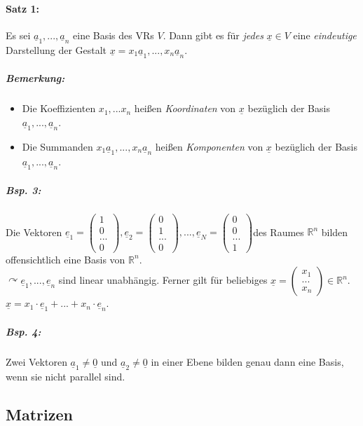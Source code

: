 \paragraph{Satz 1:}\parskp
Es sei $\underline{a}_1, ..., \underline{a}_n$ eine Basis des VRs $V$. Dann gibt es für \emph{jedes} $\underline{x}\in V$ eine \emph{eindeutige} Darstellung der Gestalt $\underline{x}=x_1\underline{a}_1, ..., x_n\underline{a}_n$.
\subparagraph{Bemerkung:}
\begin{itemize}
\item Die Koeffizienten $x_1,...x_n$ heißen \emph{Koordinaten} von $\underline{x}$ bezüglich der Basis $\underline{a}_1, ..., \underline{a}_n$.
\item Die Summanden $x_1\underline{a}_1, ..., x_n\underline{a}_n$ heißen \emph{Komponenten} von $\underline{x}$ bezüglich der Basis $\underline{a}_1, ..., \underline{a}_n$.
\end{itemize}
\subparagraph{Bsp. 3:} \parskp
Die Vektoren $\underline{e}_1=\begin{pmatrix}
1\\0\\...\\0
\end{pmatrix}, \underline{e}_2=\begin{pmatrix}
0\\1\\...\\0
\end{pmatrix}, ..., \underline{e}_N=\begin{pmatrix}
0\\0\\...\\1
\end{pmatrix}$des Raumes $\mathbb{R}^n$ bilden offensichtlich eine Basis von $\mathbb{R}^n$.\\
$\curvearrowright \underline{e}_1, ..., \underline{e}_n$ sind linear unabhängig. Ferner gilt für beliebiges $\underline{x}=\begin{pmatrix}
x_1 \\ ...\\ x_n
\end{pmatrix}\in \mathbb{R}^n$. $\underline{x}=x_1\cdot \underline{e}_1+...+x_n \cdot \underline{e}_n$.
\subparagraph{Bsp. 4:} \parskp
Zwei Vektoren $\underline{a}_1 \not = \underline{0}$ und $\underline{a}_2 \not = \underline{0}$ in einer Ebene bilden genau dann eine Basis, wenn sie nicht parallel sind.

\subsection{Matrizen}

